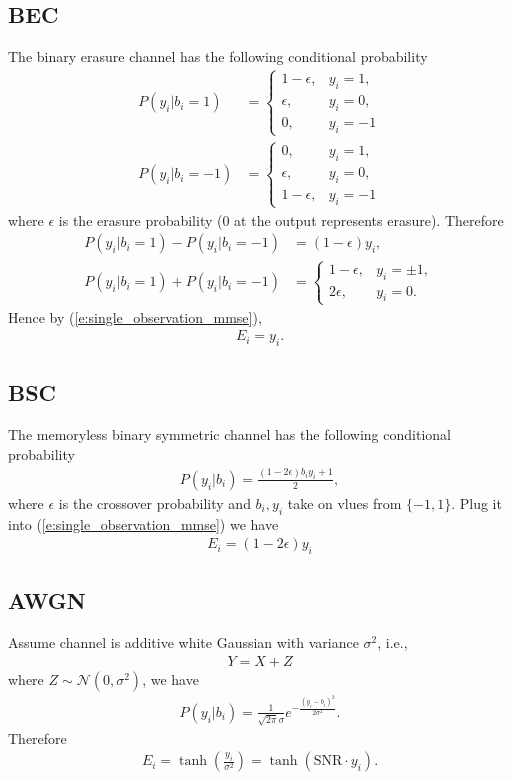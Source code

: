 \documentclass[12pt]{article}
\begin{document}
\subsection{BEC}
The binary erasure channel has the following conditional probability
\begin{align}
P(y_i|b_i=1) &= \begin{cases}
1-\epsilon, &y_i=1,\\
\epsilon, &y_i=0,\\
0, &y_i=-1
\end{cases}\\
P(y_i|b_i=-1) &= \begin{cases}
0, &y_i=1,\\
\epsilon, &y_i=0,\\
1-\epsilon, &y_i=-1
\end{cases}
\end{align}
where $\epsilon$ is the erasure probability (0 at the output represents erasure). Therefore
\begin{align}
P(y_i|b_i=1)-P(y_i|b_i=-1) &= (1-\epsilon)y_i, \\
P(y_i|b_i=1)+P(y_i|b_i=-1) &= \begin{cases}
1-\epsilon, &y_i=\pm 1,\\
2\epsilon, &y_i = 0.
\end{cases}
\end{align}
Hence by (\ref{e:single_observation_mmse}),
\begin{align}
E_i = y_i.
\end{align}
\subsection{BSC}
The memoryless binary symmetric channel has the following conditional probability
\begin{align}
P(y_i|b_i) = \frac{(1-2\epsilon)b_iy_i+1}{2},
\end{align}
where $\epsilon$ is the crossover probability and $b_i, y_i$ take on vlues from $\{-1, 1\}$. Plug it into (\ref{e:single_observation_mmse}) we have
\begin{align}
E_i = (1-2\epsilon)y_i
\end{align}
\subsection{AWGN}
Assume channel is additive white Gaussian with variance $\sigma^2$, i.e.,
\begin{align}
Y = X + Z
\end{align}
where $Z\sim \mathcal{N}(0, \sigma^2)$, we have
\begin{align}
P(y_i|b_i) = \frac{1}{\sqrt{2\pi}\sigma}e^{-\frac{(y_i-b_i)^2}{2\sigma^2}}.
\end{align}
Therefore
\begin{align}
E_i = \tanh\left(\frac{y_i}{\sigma^2}\right)=\tanh(\mathrm{SNR}\cdot y_i).
\end{align}
\end{document}
